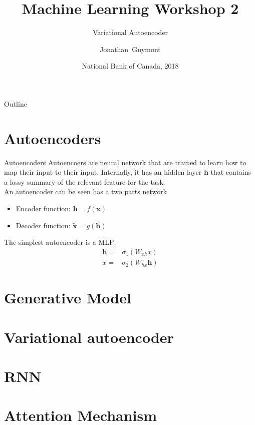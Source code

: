 \documentclass{beamer}
\title{Machine Learning Workshop 2}
\subtitle{Variational Autoencoder}
\author{Jonathan~Guymont}
\date{National Bank of Canada, 2018}
\begin{document}
\begin{frame}
	\titlepage 
\end{frame}

\begin{frame}{Outline}
	\tableofcontents
\end{frame}

\section{Autoencoders}

\begin{frame}{Autoencoders}
Autoencoers are neural network that are trained to learn how to map their input to their input. Internally, it has an hidden layer $\bm{h}$ that contains a lossy summary of the relevant feature for the task.\\

An autoencoder can be seen has a two parts network
\begin{itemize}
	\item Encoder function: $\bm{h}=f(\bm{x})$
	\item Decoder function: $\tilde{\bm{x}} = g(\bm{h})$
\end{itemize}

The simplest autoencoder is a MLP:
\begin{equation}
\begin{split}
\bm{h} =& \sigma_1\left(W_{xh}x\right)\\
\tilde{x} =& \sigma_2\left(W_{hx}\bm{h}\right) 
\end{split}
\end{equation}
\end{frame}
 
\section{Generative Model}

\section{Variational autoencoder}

\section{RNN}

\section{Attention Mechanism}
\end{document}
